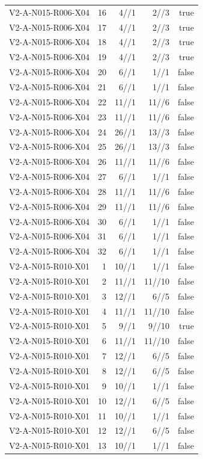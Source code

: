 {\begin{longtable}{lrrrr}
V2-A-N015-R006-X04 & 16 & 4//1 & 2//3 & true \\
V2-A-N015-R006-X04 & 17 & 4//1 & 2//3 & true \\
V2-A-N015-R006-X04 & 18 & 4//1 & 2//3 & true \\
V2-A-N015-R006-X04 & 19 & 4//1 & 2//3 & true \\
V2-A-N015-R006-X04 & 20 & 6//1 & 1//1 & false \\
V2-A-N015-R006-X04 & 21 & 6//1 & 1//1 & false \\
V2-A-N015-R006-X04 & 22 & 11//1 & 11//6 & false \\
V2-A-N015-R006-X04 & 23 & 11//1 & 11//6 & false \\
V2-A-N015-R006-X04 & 24 & 26//1 & 13//3 & false \\
V2-A-N015-R006-X04 & 25 & 26//1 & 13//3 & false \\
V2-A-N015-R006-X04 & 26 & 11//1 & 11//6 & false \\
V2-A-N015-R006-X04 & 27 & 6//1 & 1//1 & false \\
V2-A-N015-R006-X04 & 28 & 11//1 & 11//6 & false \\
V2-A-N015-R006-X04 & 29 & 11//1 & 11//6 & false \\
V2-A-N015-R006-X04 & 30 & 6//1 & 1//1 & false \\
V2-A-N015-R006-X04 & 31 & 6//1 & 1//1 & false \\
V2-A-N015-R006-X04 & 32 & 6//1 & 1//1 & false \\
V2-A-N015-R010-X01 & 1 & 10//1 & 1//1 & false \\
V2-A-N015-R010-X01 & 2 & 11//1 & 11//10 & false \\
V2-A-N015-R010-X01 & 3 & 12//1 & 6//5 & false \\
V2-A-N015-R010-X01 & 4 & 11//1 & 11//10 & false \\
V2-A-N015-R010-X01 & 5 & 9//1 & 9//10 & true \\
V2-A-N015-R010-X01 & 6 & 11//1 & 11//10 & false \\
V2-A-N015-R010-X01 & 7 & 12//1 & 6//5 & false \\
V2-A-N015-R010-X01 & 8 & 12//1 & 6//5 & false \\
V2-A-N015-R010-X01 & 9 & 10//1 & 1//1 & false \\
V2-A-N015-R010-X01 & 10 & 12//1 & 6//5 & false \\
V2-A-N015-R010-X01 & 11 & 10//1 & 1//1 & false \\
V2-A-N015-R010-X01 & 12 & 12//1 & 6//5 & false \\
V2-A-N015-R010-X01 & 13 & 10//1 & 1//1 & false \\

\end{longtable}}
